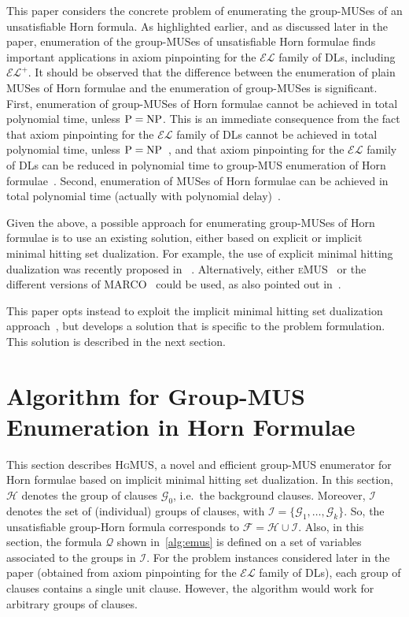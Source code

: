 \documentclass{llncs}
\newcommand{\tn}{\textnormal}
\newcommand{\fml}[1]{{\mathcal{#1}}}
\newcommand{\elplus}{$\fml{EL}^{+}$\xspace}
\newcommand{\elplain}{$\fml{EL}$\xspace}
\newcommand{\hgmus}{\textsc{HgMUS}\xspace}
\newcommand{\emus}{\textsc{eMUS}\xspace}
\begin{document}
This paper considers the concrete problem of enumerating the
group-MUSes of an unsatisfiable Horn formula. As highlighted earlier,
and as discussed later in the paper, enumeration of the group-MUSes of
unsatisfiable Horn formulae finds important applications in axiom
pinpointing for the \elplain family of DLs, including \elplus.
It should be observed that the difference between the enumeration of
plain MUSes of Horn formulae and the enumeration of group-MUSes is
significant.
First, enumeration of group-MUSes of Horn formulae cannot be achieved
in total polynomial time, unless $\tn{P}=\tn{NP}$. This is an
immediate consequence from the fact that axiom pinpointing for the
\elplain family of DLs cannot be achieved in total polynomial time,
unless $\tn{P}=\tn{NP}$~\cite{baader-ki07}, and that axiom pinpointing
for the \elplain family of DLs can be reduced in polynomial time to
group-MUS enumeration of Horn formulae~\cite{ams-corr15}.
Second, enumeration of MUSes of Horn formulae can be achieved in total
polynomial time (actually with polynomial delay)~\cite{penaloza-kr10}.

Given the above, a possible approach for enumerating group-MUSes of
Horn formulae is to use an existing solution, either based on explicit
or implicit minimal hitting set dualization. For example, the use of
explicit minimal hitting dualization was recently proposed in ~\cite{ams-corr15}.
Alternatively, either \emus~\cite{pms-aaai13} or the different versions
of MARCO~\cite{liffiton-cpaior13,lpmms-cj15} could be used, as also
pointed out in~\cite{mp-tr15}.

This paper opts instead to exploit the implicit minimal hitting set
dualization approach~\cite{liffiton-cpaior13,pms-aaai13,lpmms-cj15},
but develops a solution that is specific to the problem formulation.
This solution is described in the next section.
 
 
 
\section{Algorithm for Group-MUS Enumeration in Horn Formulae}
\label{sec:hegmus}

This section describes \hgmus, a novel and efficient group-MUS
enumerator for Horn formulae based on implicit minimal hitting set
dualization.
In this section, $\fml{H}$ denotes the group of clauses $\fml{G}_0$,
i.e.\ the background clauses. Moreover, $\fml{I}$ denotes the set of
(individual) groups of clauses, with
$\fml{I}=\{\fml{G}_1,\ldots,\fml{G}_k\}$.
So, the unsatisfiable group-Horn formula corresponds to
$\fml{F}=\fml{H}\cup\fml{I}$.
Also, in this section, the formula $\fml{Q}$ shown
in~\autoref{alg:emus} is defined on a set of variables associated to
the groups in $\fml{I}$.
For the problem instances considered
later in the paper (obtained from axiom pinpointing for the \elplain
family of DLs), each group of clauses contains a single unit clause.
However, the algorithm would work for arbitrary groups of clauses.
\end{document}
